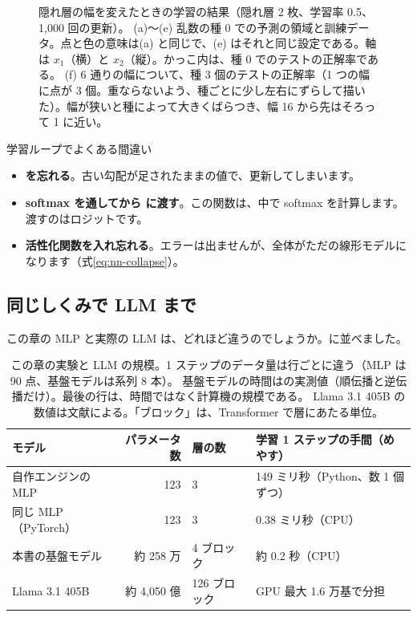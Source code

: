 \begin{figure}[tbp]
\caption{隠れ層の幅を変えたときの学習の結果（隠れ層 2 枚、学習率 0.5、1,000 回の更新）。
(a)〜(e) 乱数の種 0 での予測の領域と訓練データ。点と色の意味は(a) と同じで、(e) はそれと同じ設定である。軸は $x_1$（横）と $x_2$（縦）。かっこ内は、種 0 でのテストの正解率である。
(f) 6 通りの幅について、種 3 個のテストの正解率（1 つの幅に点が 3 個。重ならないよう、種ごとに少し左右にずらして描いた）。幅が狭いと種によって大きくばらつき、幅 16 から先はそろって 1 に近い。}
\label{fig:nn-width-sweep}
\end{figure}

\begin{caution}{学習ループでよくある間違い}
\begin{itemize}
\item \textbf{ を忘れる}。古い勾配が足されたままの値で、更新してしまいます。
\item \textbf{softmax を通してから  に渡す}。この関数は、中で softmax を計算します。渡すのはロジットです。
\item \textbf{活性化関数を入れ忘れる}。エラーは出ませんが、全体がただの線形モデルになります（式\eqref{eq:nn-collapse}）。
\end{itemize}
\end{caution}

\subsection*{同じしくみで LLM まで}

この章の MLP と実際の LLM は、どれほど違うのでしょうか。に並べました。

\begin{table}[tbp]
\centering
\caption{この章の実験と LLM の規模。1 ステップのデータ量は行ごとに違う（MLP は 90 点、基盤モデルは系列 8 本）。
基盤モデルの時間はの実測値（順伝播と逆伝播だけ）。最後の行は、時間ではなく計算機の規模である。
Llama 3.1 405B の数値は文献\cite{dubey2024llama3}による。「ブロック」は、Transformer で層にあたる単位。}
\label{tab:nn-scale}
\small
\begin{tabular}{lrll}
\toprule
モデル & パラメータ数 & 層の数 & 学習 1 ステップの手間（めやす） \\
\midrule
自作エンジンの MLP & 123 & 3 & 149 ミリ秒（Python、数 1 個ずつ） \\
同じ MLP（PyTorch） & 123 & 3 & 0.38 ミリ秒（CPU） \\
本書の基盤モデル & 約 258 万 & 4 ブロック & 約 0.2 秒（CPU） \\
Llama 3.1 405B & 約 4,050 億 & 126 ブロック & GPU 最大 1.6 万基で分担 \\
\bottomrule
\end{tabular}
\end{table}

